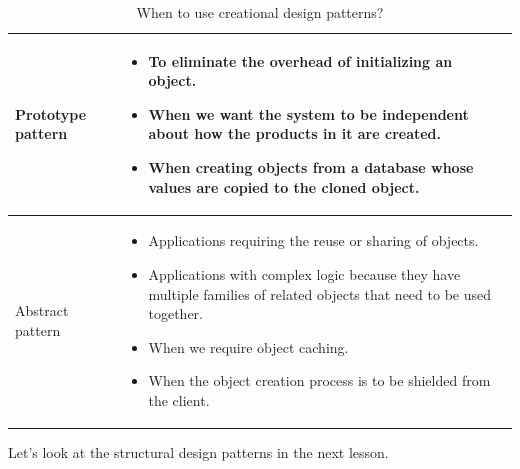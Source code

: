 \begin{table}[htbp]
{\begin{tabular}{|p{}|p{}|}
\hline
\hfill\break Prototype pattern & \begin{itemize} \tightlist \item To eliminate the overhead of initializing an object. \item When we want the system to be independent about how the products in it are created. \item When creating objects from a database whose values are copied to the cloned object. \end{itemize} \\
\hline
\hfill\break \hfill\break Abstract pattern & \begin{itemize} \tightlist \item Applications requiring the reuse or sharing of objects. \item Applications with complex logic because they have multiple families of related objects that need to be used together. \item When we require object caching. \item When the object creation process is to be shielded from the client. \end{itemize} \\
\hline
\end{tabular}
}
\caption{When to use creational design patterns?}
\end{table}

Let's look at the structural design patterns in the next lesson.

